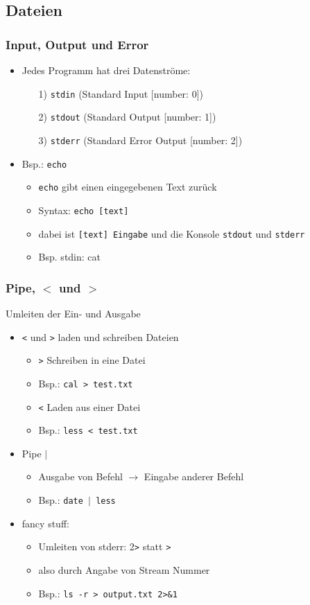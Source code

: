 \documentclass[12pt,utf8]{beamer}
\begin{document}
\subsection{Dateien}
\begin{frame}
\frametitle{Input, Output und Error}
\begin{itemize}
	\item Jedes Programm hat drei Datenströme:
	\begin{itemize}
		\item[1)] \texttt{stdin} (Standard Input [number: 0])
		\item[2)] \texttt{stdout} (Standard Output [number: 1])
		\item[3)] \texttt{stderr} (Standard Error Output [number: 2])
	\end{itemize}
	\item Bsp.: \texttt{echo}
	\begin{itemize}[<+->]
		\item \texttt{echo} gibt einen eingegebenen Text zurück
		\item Syntax: \texttt{echo [text]}
		\item dabei ist \texttt{[text] Eingabe} und die Konsole \texttt{stdout} und \texttt{stderr}
		\item Bsp. stdin: cat
	\end{itemize}
\end{itemize}
\end{frame}


\begin{frame}
\frametitle{Pipe, $<$ und $>$ }
Umleiten der Ein- und Ausgabe
\begin{itemize}
	\item \texttt{<} und \texttt{>} laden und schreiben Dateien
	\begin{itemize}[<+->]
		\item \texttt{>} Schreiben in eine Datei
		\item Bsp.: \texttt{cal > test.txt}
		\item \texttt{<} Laden aus einer Datei
		\item Bsp.: \texttt{less < test.txt}
	\end{itemize}
	\item Pipe \texttt{$\mid$}
	\begin{itemize}[<+->]
		\item Ausgabe von Befehl $\to$ Eingabe anderer Befehl
		\item Bsp.: \texttt{date $\mid$ less}
	\end{itemize}
	\item fancy stuff:
	\begin{itemize}[<+->]
		\item Umleiten von stderr: 2\texttt{>} statt \texttt{>}
		\item also durch Angabe von Stream Nummer
		\item Bsp.: \texttt{ls -r > output.txt 2>\&1 }
	\end{itemize}
\end{itemize}
\end{frame}
\end{document}
